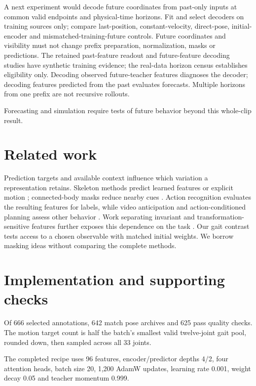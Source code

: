\documentclass{article}
\begin{document}
A next experiment would decode future coordinates from past-only inputs
at common valid endpoints and physical-time horizons. Fit and select
decoders on training sources only; compare last-position,
constant-velocity, direct-pose, initial-encoder and
mismatched-training-future controls. Future coordinates and visibility
must not change prefix preparation, normalization, masks or predictions.
The retained past-feature readout and future-feature decoding studies
have synthetic training evidence; the real-data horizon census
establishes eligibility only. Decoding observed future-teacher features
diagnoses the decoder; decoding features predicted from the past
evaluates forecasts. Multiple horizons from one prefix are not recursive
rollouts.

Forecasting and simulation require tests of future behavior beyond this
whole-clip result.

\section{Related work}\label{related-work}

Prediction targets and available context influence which variation a
representation retains. Skeleton methods predict learned features
\citep{sjepa} or explicit motion \citep{mamp}; connected-body masks
reduce nearby cues \citep{slim}. Action recognition evaluates the
resulting features for labels, while video anticipation and
action-conditioned planning assess other behavior \citep{vjepa2}. Work
separating invariant and transformation-sensitive features further
exposes this dependence on the task \citep{seqjepa}. Our gait contrast
tests access to a chosen observable with matched initial weights. We
borrow masking ideas without comparing the complete methods.

\clearpage


\clearpage
\appendix
\section{Implementation and supporting
checks}\label{implementation-and-supporting-checks}

Of 666 selected annotations, 642 match pose archives and 625 pass
quality checks. The motion target count is half the batch's smallest
valid twelve-joint gait pool, rounded down, then sampled across all 33
joints.

The completed recipe uses 96 features, encoder/predictor depths 4/2,
four attention heads, batch size 20, 1,200 AdamW updates, learning rate
0.001, weight decay 0.05 and teacher momentum 0.999.
\end{document}
